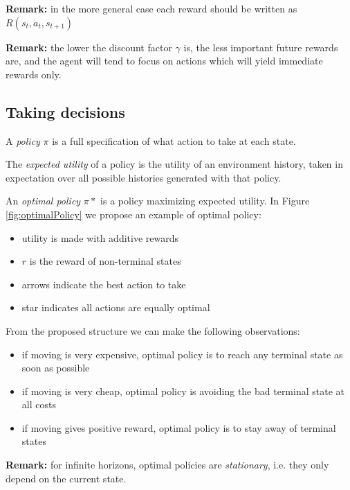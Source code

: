 \textbf{Remark:} in the more general case each reward should be written as $R(s_{t}
, a_{t}, s_{t+1})$
\newline

\textbf{Remark:} the lower the discount factor $\gamma$ is, the less important
future rewards are, and the agent will tend to focus on actions which will yield
immediate rewards only.

\subsection{Taking decisions}
A \textit{policy} $\pi$ is a full specification of what action to take at each
state.
\newline

The \textit{expected utility} of a policy is the utility of an environment history,
taken in expectation over all possible histories generated with that policy.
\newline

An \textit{optimal policy} $\pi*$ is a policy maximizing expected utility. In
Figure \ref{fig:optimalPolicy} we propose an example of optimal policy:
\begin{itemize}
	\item utility is made with additive rewards

	\item $r$ is the reward of non-terminal states

	\item arrows indicate the best action to take

	\item star indicates all actions are equally optimal
\end{itemize}
From the proposed structure we can make the following observations:
\begin{itemize}
	\item if moving is very expensive, optimal policy is to reach any terminal
		state as soon as possible

	\item if moving is very cheap, optimal policy is avoiding the bad terminal
		state at all costs

	\item if moving gives positive reward, optimal policy is to stay away of
		terminal states
\end{itemize}

\textbf{Remark:} for infinite horizons, optimal policies are \textit{stationary},
i.e. they only depend on the current state.

